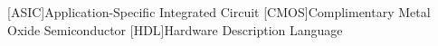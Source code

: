 \begin{acronym}
    [ASIC]{Application-Specific Integrated Circuit}
    [CMOS]{Complimentary Metal Oxide Semiconductor}
    [HDL]{Hardware Description Language}
\end{acronym}